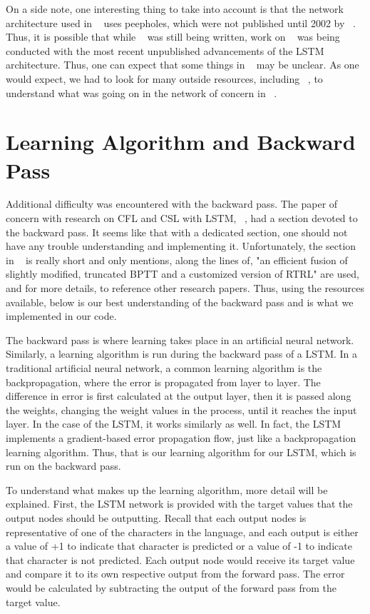 \documentclass[11pt,letterpaper]{article}
\begin{document}
On a side note, one interesting thing to take into account is that the network architecture used in ~\cite{Gers:01} uses peepholes, which were not published until 2002 by ~\cite{Gers:02}. Thus, it is possible that while ~\cite{Gers:02} was still being written, work on ~\cite{Gers:01} was being conducted with the most recent unpublished advancements of the LSTM architecture. Thus, one can expect that some things in ~\cite{Gers:01} may be unclear. As one would expect, we had to look for many outside resources, including ~\cite{Gers:02}, to understand what was going on in the network of concern in ~\cite{Gers:01}.

\section{Learning Algorithm and Backward Pass}
Additional difficulty was encountered with the backward pass. The paper of concern with research on CFL and CSL with LSTM, ~\cite{Gers:01}, had a section devoted to the backward pass. It seems like that with a dedicated section, one should not have any trouble understanding and implementing it. Unfortunately, the section in ~\cite{Gers:01} is really short and only mentions, along the lines of, "an efficient fusion of slightly modified, truncated BPTT and a customized version of RTRL" are used, and for more details, to reference other research papers. Thus, using the resources available, below is our best understanding of the backward pass and is what we implemented in our code.

The backward pass is where learning takes place in an artificial neural network. Similarly, a learning algorithm is run during the backward pass of a LSTM. In a traditional artificial neural network, a common learning algorithm is the backpropagation, where the error is propagated from layer to layer. The difference in error is first calculated at the output layer, then it is passed along the weights, changing the weight values in the process, until it reaches the input layer. In the case of the LSTM, it works similarly as well. In fact, the LSTM implements a gradient-based error propagation flow, just like a backpropagation learning algorithm. Thus, that is our learning algorithm for our LSTM, which is run on the backward pass.

To understand what makes up the learning algorithm, more detail will be explained. First, the LSTM network is provided with the target values that the output nodes should be outputting. Recall that each output nodes is representative of one of the characters in the language, and each output is either a value of +1 to indicate that character is predicted or a value of -1 to indicate that character is not predicted. Each output node would receive its target value and compare it to its own respective output from the forward pass. The error would be calculated by subtracting the output of the forward pass from the target value.
\end{document}
